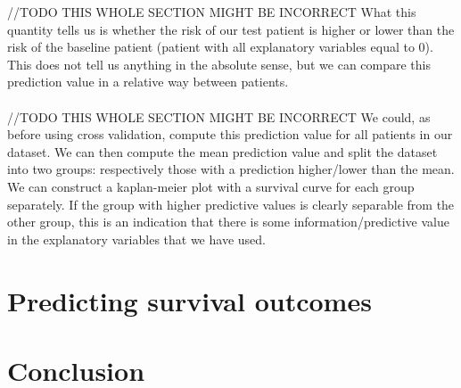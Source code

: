  //TODO THIS WHOLE SECTION MIGHT BE INCORRECT
 What this quantity tells us is whether the risk of our test patient is higher or lower than the risk of the baseline patient (patient with all explanatory variables equal to $0$). This does not tell us anything in the absolute sense, but we can compare this prediction value in a relative way between patients. \\ \\
 //TODO THIS WHOLE SECTION MIGHT BE INCORRECT
 We could, as before using cross validation, compute this prediction value for all patients in our dataset. We can then compute the mean prediction value and split the dataset into two groups: respectively those with a prediction higher/lower than the mean. We can construct a kaplan-meier plot with a survival curve for each group separately. If the group with higher predictive values is clearly separable from the other group, this is an indication that there is some information/predictive value in the explanatory variables that we have used.
\section{Predicting survival outcomes}
\label{sec:evaluation-predictingsurvival}

\section{Conclusion}
\label{sec:evaluation-conclusion}
